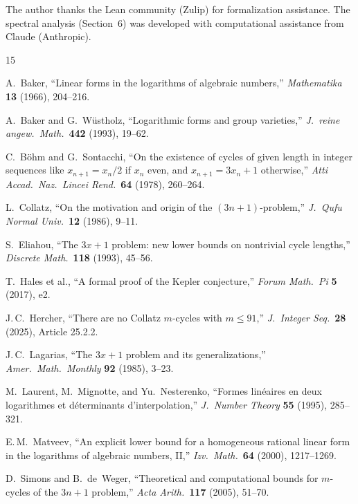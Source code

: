 \documentclass[11pt,a4paper]{article}
\theoremstyle{plain}
\theoremstyle{definition}
\begin{document}
The author thanks the Lean community (Zulip) for formalization assistance. The spectral analysis (Section~6) was developed with computational assistance from Claude (Anthropic).

\begin{thebibliography}{15}

A.~Baker, ``Linear forms in the logarithms of algebraic numbers,''
\textit{Mathematika} \textbf{13} (1966), 204--216.

A.~Baker and G.~W\"ustholz, ``Logarithmic forms and group varieties,''
\textit{J.~reine angew.\ Math.}\ \textbf{442} (1993), 19--62.

C.~B\"ohm and G.~Sontacchi, ``On the existence of cycles of given length in integer sequences like $x_{n+1} = x_n/2$ if $x_n$ even, and $x_{n+1} = 3x_n+1$ otherwise,''
\textit{Atti Accad.\ Naz.\ Lincei Rend.}\ \textbf{64} (1978), 260--264.

L.~Collatz, ``On the motivation and origin of the $(3n+1)$-problem,''
\textit{J.~Qufu Normal Univ.}\ \textbf{12} (1986), 9--11.

S.~Eliahou, ``The $3x+1$ problem: new lower bounds on nontrivial cycle lengths,''
\textit{Discrete Math.}\ \textbf{118} (1993), 45--56.

T.~Hales et al., ``A formal proof of the Kepler conjecture,''
\textit{Forum Math.\ Pi} \textbf{5} (2017), e2.

J.\,C.~Hercher, ``There are no Collatz $m$-cycles with $m \leq 91$,''
\textit{J.~Integer Seq.}\ \textbf{28} (2025), Article 25.2.2.

J.\,C.~Lagarias, ``The $3x+1$ problem and its generalizations,''
\textit{Amer.\ Math.\ Monthly} \textbf{92} (1985), 3--23.

M.~Laurent, M.~Mignotte, and Yu.~Nesterenko, ``Formes lin\'eaires en deux logarithmes et d\'eterminants d'interpolation,''
\textit{J.~Number Theory} \textbf{55} (1995), 285--321.

E.\,M.~Matveev, ``An explicit lower bound for a homogeneous rational linear form in the logarithms of algebraic numbers, II,''
\textit{Izv.\ Math.}\ \textbf{64} (2000), 1217--1269.

D.~Simons and B.~de~Weger, ``Theoretical and computational bounds for $m$-cycles of the $3n+1$ problem,''
\textit{Acta Arith.}\ \textbf{117} (2005), 51--70.


\end{thebibliography}
\end{document}
